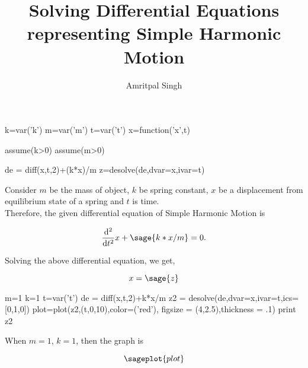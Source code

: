 \documentclass{article}
\title{Solving Differential Equations representing Simple Harmonic Motion}
\author{Amritpal Singh}
\begin{document}
\maketitle

\begin{sagesilent}
k=var('k')
m=var('m')
t=var('t')
x=function('x',t)

assume(k>0)
assume(m>0)

de = diff(x,t,2)+(k*x)/m
z=desolve(de,dvar=x,ivar=t)
\end{sagesilent}
Consider $m$ be the mass of object, $k$ be spring constant, $x$ be a displacement from equilibrium state of a spring and $t$ is time. 
\\Therefore, the given differential equation of Simple Harmonic Motion is  

\begin{comment}
\begin{sagesilent}
F=var('F') 
a=var('a')
\end{sagesilent}

\[
 \sage{F==m*a} --1 \\ 
 \sage{F==-k*x} --2
\]
\end{comment}

\[
  \frac{\mathrm{d}^{2}}{\mathrm{d}t^{2}}x +  \sage{k*x/m} = 0.
\]


Solving the above differential equation, we get,

$$x = \sage{z}$$












\begin{sagesilent}
m=1
k=1
t=var('t')
de = diff(x,t,2)+k*x/m
z2 = desolve(de,dvar=x,ivar=t,ics=[0,1,0])
plot=plot(z2,(t,0,10),color=('red'), figsize = (4,2.5),thickness = .1)
print z2
\end{sagesilent}


When $m=1$, $k=1$, then the graph is

$$\sageplot{plot}$$
\end{document}
